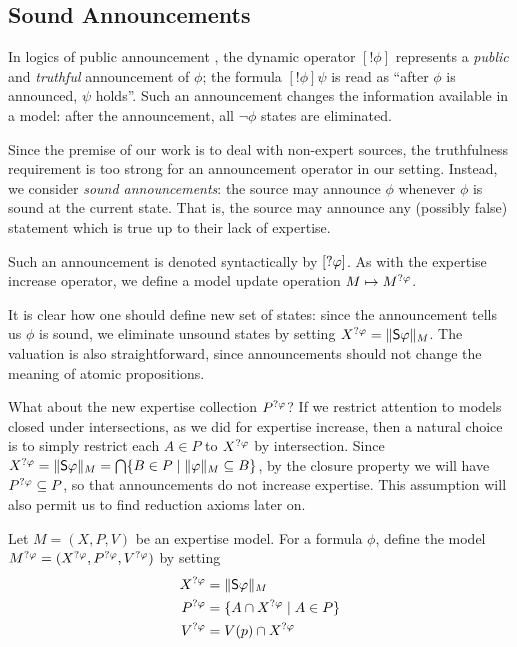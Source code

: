 \subsection{Sound Announcements}

In logics of public announcement \cite{plaza2007logics,van_Ditmarsch_2008},
the dynamic operator $[!\phi]$ represents a \emph{public} and \emph{truthful}
announcement of $\phi$; the formula $[!\phi]\psi$ is read as ``after
$\phi$ is announced, $\psi$ holds''. Such an announcement changes
the information available in a model: after the announcement, all
$\neg\phi$ states are eliminated.

Since the premise of our work is to deal with non-expert sources, the
truthfulness requirement is too strong for an announcement operator in our
setting. Instead, we consider \emph{sound announcements}: the source may announce
$\phi$ whenever $\phi$ is sound at the current state. That is, the
source may announce any (possibly false) statement which is true up to their
lack of expertise.

Such an announcement is denoted syntactically by $[?\varphi]$. As with
the expertise increase operator, we define a model update operation
$M \mapsto M^{?\varphi}$.

It is clear how one should define new set of
states: since the announcement tells us $\phi$ is sound, we eliminate
unsound states by setting $X^{?\varphi} = \|\mathsf{S}\varphi\|_M$. The valuation
is also straightforward, since announcements should not change the meaning of
atomic propositions.

What about the new expertise collection $P^{?\varphi}$? If we restrict
attention to models closed under intersections, as we did for expertise
increase, then a natural choice is to simply restrict each $A \in P$ to
$X^{?\varphi}$ by intersection. Since $X^{?\varphi} =
\|\mathsf{S}\varphi\|_M = \bigcap\{B \in P \mid \|\varphi\|_M \subseteq B\}$, by the closure
property we will have $P^{?\varphi} \subseteq P$, so that
announcements do not increase expertise. This assumption will also permit us to
find reduction axioms later on.

\begin{definition}
\label{exp_def_sndann_model}
Let $M = (X, P, V)$ be an expertise model. For a formula $\phi$,
define the model $M^{?\varphi} = (X^{?\varphi}, P^{?\varphi},
V^{?\varphi})$ by setting
\[
\begin{aligned}
  X^{?\varphi} &= \|\mathsf{S}\varphi\|_M \\
  P^{?\varphi} &= \{A \cap X^{?\varphi} \mid A \in P\} \\
  V^{?\varphi} &= V(p) \cap X^{?\varphi}
\end{aligned}\]
\end{definition}

